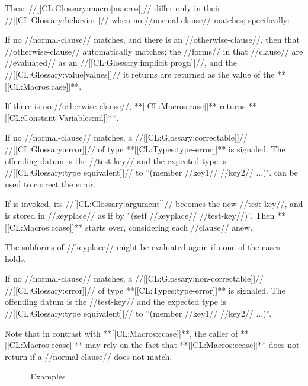 These //[[CL:Glossary:macro|macros]]// differ only in their //[[CL:Glossary:behavior]]// when no //normal-clause// matches; specifically:

\beginlist


If no //normal-clause// matches, and there is an //otherwise-clause//, then that //otherwise-clause// automatically matches; the //forms// in that //clause// are //evaluated// as an //[[CL:Glossary:implicit progn]]//, and the //[[CL:Glossary:value|values]]// it returns are returned as the value of the **[[CL:Macros:case]]**.

If there is no //otherwise-clause//, **[[CL:Macros:case]]** returns **[[CL:Constant Variables:nil]]**.


If no //normal-clause// matches, a //[[CL:Glossary:correctable]]// //[[CL:Glossary:error]]// of type **[[CL:Types:type-error]]** is signaled. The offending datum is the //test-key// and the expected type is //[[CL:Glossary:type equivalent]]// to ''(member //key1// //key2// ...)''.  can be used to correct the error.

If  is invoked, its //[[CL:Glossary:argument]]// becomes the new //test-key//, and is stored in //keyplace// as if by ''(setf //keyplace// //test-key//)''. Then **[[CL:Macros:ccase]]** starts over, considering each //clause// anew.


The subforms of //keyplace// might be evaluated again if none of the cases holds.


If no //normal-clause// matches, a //[[CL:Glossary:non-correctable]]// //[[CL:Glossary:error]]// of type **[[CL:Types:type-error]]** is signaled. The offending datum is the //test-key// and the expected type is //[[CL:Glossary:type equivalent]]// to ''(member //key1// //key2// ...)''.

Note that in contrast with **[[CL:Macros:ccase]]**, the caller of **[[CL:Macros:ecase]]** may rely on the fact that **[[CL:Macros:ecase]]** does not return if a //normal-clause// does not match.

\endlist

====Examples====

